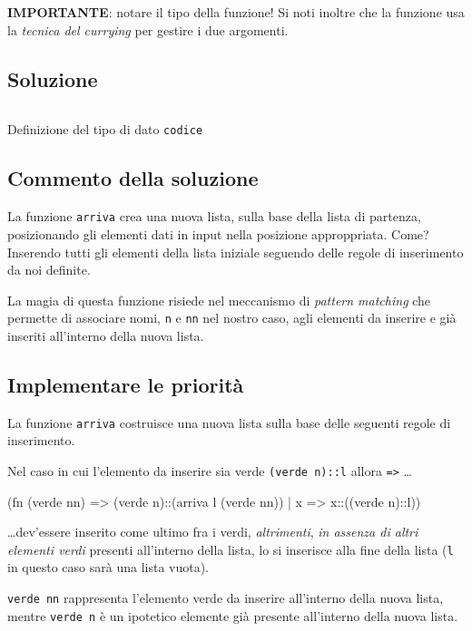 \medskip
\textbf{IMPORTANTE}: notare il tipo della funzione! Si noti inoltre che la funzione usa la \emph{tecnica del currying} per gestire i due argomenti.

\subsection{Soluzione}

\begin{listing}[!h]
\inputminted{sml}{assets/codes/2015.09/arriva-alt.sml}
\caption[]{Definizione del tipo di dato \texttt{codice}}
\end{listing}

\subsection{Commento della soluzione}

La funzione \texttt{arriva} crea una nuova lista, sulla base della lista di partenza, posizionando gli elementi dati in input nella posizione approppriata. %
Come? Inserendo tutti gli elementi della lista iniziale seguendo delle regole di inserimento da noi definite.

La magia di questa funzione risiede nel meccanismo di \emph{pattern matching} che permette di associare nomi, \texttt{n} e \texttt{nn} nel nostro caso, agli elementi da inserire e già inseriti all'interno della nuova lista.

\subsection{Implementare le priorità}

La funzione \texttt{arriva} costruisce una nuova lista sulla base delle seguenti regole di inserimento.

\medskip
Nel caso in cui l'elemento da inserire sia verde \texttt{(verde  n)::l} allora \texttt{=>} \dots

\begin{smlcode}
(fn (verde  nn) => (verde n)::(arriva l (verde nn))
 |  x           => x::((verde n)::l))
\end{smlcode}

\dots dev'essere inserito come ultimo fra i verdi, \emph{altrimenti}, \emph{in assenza di altri elementi verdi} presenti all'interno della lista, lo si inserisce alla fine della lista %
(\texttt{l} in questo caso sarà una lista vuota).

\texttt{verde  nn} rappresenta l'elemento verde da inserire all'interno della nuova lista, mentre \texttt{verde n} è un ipotetico elemente già presente all'interno della nuova lista.

